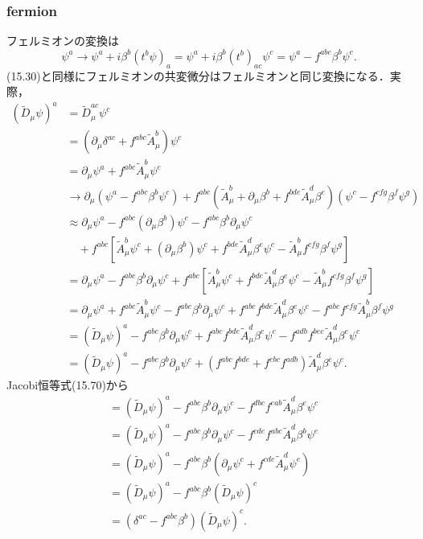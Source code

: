 \subsubsection{fermion}
フェルミオンの変換は
\[
\psi^a \to \psi^a + i \beta^b (t^b\psi)_a = \psi^a + i \beta^b (t^b)_{ac}\psi^c
= \psi^a - f^{abc} \beta^b \psi^c .
\]
(15.30)と同様にフェルミオンの共変微分はフェルミオンと同じ変換になる．実際，
\begin{align*}
  (\tilde{D}_\mu\psi)^a &= \tilde{D}_\mu^{ac} \psi^c \\
  &= (\partial_\mu\delta^{ac} + f^{abc}\tilde{A}_\mu^b) \psi^c \\
  &= \partial_\mu \psi^a + f^{abc}\tilde{A}_\mu^b \psi^c \\
  &\to \partial_\mu (\psi^a - f^{abc} \beta^b \psi^c)
  + f^{abc} (\tilde{A}_\mu^b + \partial_\mu\beta^b + f^{bde}\tilde{A}_\mu^d\beta^e)
  (\psi^c - f^{cfg}\beta^f\psi^g) \\
  &\approx \partial_\mu \psi^a - f^{abc}(\partial_\mu\beta^b)\psi^c - f^{abc} \beta^b \partial_\mu\psi^c\\
  &\quad + f^{abc} \left[ \tilde{A}_\mu^b \psi^c + (\partial_\mu\beta^b)\psi^c
  + f^{bde}\tilde{A}_\mu^d\beta^e\psi^c - \tilde{A}_\mu^b f^{cfg}\beta^f\psi^g \right] \\
  &= \partial_\mu \psi^a - f^{abc} \beta^b \partial_\mu\psi^c
  + f^{abc} \left[ \tilde{A}_\mu^b \psi^c
  + f^{bde}\tilde{A}_\mu^d\beta^e\psi^c - \tilde{A}_\mu^b f^{cfg}\beta^f\psi^g \right] \\
  &= \partial_\mu \psi^a + f^{abc} \tilde{A}_\mu^b \psi^c - f^{abc} \beta^b \partial_\mu\psi^c
  + f^{abc} f^{bde}\tilde{A}_\mu^d\beta^e\psi^c - f^{abc}f^{cfg} \tilde{A}_\mu^b\beta^f\psi^g \\
  &= (\tilde{D}_\mu\psi)^a - f^{abc} \beta^b \partial_\mu\psi^c
  + f^{abc} f^{bde}\tilde{A}_\mu^d\beta^e\psi^c - f^{adb}f^{bec} \tilde{A}_\mu^d\beta^e\psi^c \\
  &= (\tilde{D}_\mu\psi)^a - f^{abc} \beta^b \partial_\mu\psi^c
  + (f^{abc} f^{bde} + f^{ebc}f^{adb}) \tilde{A}_\mu^d\beta^e\psi^c .
\end{align*}
Jacobi恒等式(15.70)から
\begin{align*}
  &= (\tilde{D}_\mu\psi)^a - f^{abc} \beta^b \partial_\mu\psi^c
  - f^{dbc}f^{eab} \tilde{A}_\mu^d\beta^e\psi^c \\
  &= (\tilde{D}_\mu\psi)^a - f^{abc} \beta^b \partial_\mu\psi^c
  - f^{cde}f^{abc} \tilde{A}_\mu^d\beta^b\psi^e \\
  &= (\tilde{D}_\mu\psi)^a - f^{abc} \beta^b (\partial_\mu\psi^c + f^{cde} \tilde{A}_\mu^d \psi^e) \\
  &= (\tilde{D}_\mu\psi)^a - f^{abc} \beta^b (\tilde{D}_\mu\psi)^c \\
  &= (\delta^{ac} - f^{abc} \beta^b) (\tilde{D}_\mu\psi)^c .
\end{align*}

